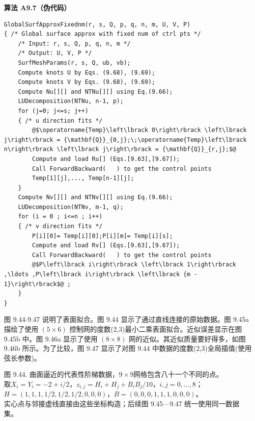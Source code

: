 \documentclass[../main.tex]{subfiles}
\begin{document}
\par\medskip\noindent\textbf{算法 A9.7（伪代码）}\par
\begin{verbatim}
GlobalSurfApproxFixednm(r, s, Q, p, q, n, m, U, V, P)
{ /* Global surface approx with fixed num of ctrl pts */
    /* Input: r, s, Q, p, q, n, m */
    /* Output: U, V, P */
    SurfMeshParams(r, s, Q, ub, vb);
    Compute knots U by Eqs. (9.68), (9.69);
    Compute knots V by Eqs. (9.68), (9.69);
    Compute Nu[][] and NTNu[][] using Eq.(9.66);
    LUDecomposition(NTNu, n-1, p);
    for (j=0; j<=s; j++)
    { /* u direction fits */
        @$\operatorname{Temp}\left\lbrack 0\right\rbrack \left\lbrack j\right\rbrack = {\mathbf{Q}}_{0,j};\;\operatorname{Temp}\left\lbrack n\right\rbrack \left\lbrack j\right\rbrack = {\mathbf{Q}}_{r,j};$@
        Compute and load Ru[] (Eqs.[9.63],[9.67]);
        Call ForwardBackward(   ) to get the control points
        Temp[1][j],..., Temp[n-1][j];
    }
    Compute Nv[][] and NTNv[][] using Eq.(9.66);
    LUDecomposition(NTNv, m-1, q);
    for (i = 0 ; i<=n ; i++)
    { /* v direction fits */
        P[i][0]= Temp[i][0];P[i][m]= Temp[i][s];
        Compute and load Rv[] (Eqs.[9.63],[9.67]);
        Call ForwardBackward(   ) to get the control points
        @$P\left\lbrack i\right\rbrack \left\lbrack 1\right\rbrack ,\ldots ,P\left\lbrack i\right\rbrack \left\lbrack {m - 1}\right\rbrack$@ ;
    }
}
\end{verbatim}

图 9.44-9.47 说明了表面拟合。图 9.44 显示了通过直线连接的原始数据。图 9.45a 描绘了使用 \(\left( {5 \times  6}\right)\) 控制网的度数(2,3)最小二乘表面拟合。近似误差显示在图 9.45b 中。图 9.46a 显示了使用 \(\left( {8 \times  8}\right)\) 网的近似。其近似质量要好得多，如图 9.46b 所示。为了比较，图 9.47 显示了对图 9.44 中数据的度数(2,3)全局插值(使用弦长参数)。

\begin{center}
\begin{minipage}{25cm}
\vspace*{.6\baselineskip}
\centering
{}
\par\smallskip
图 9.44. 曲面逼近的代表性阶梯数据，$9\times9$网格包含八十一个不同的点。\\
取$X_i=Y_i=-2+i/2$，$z_{i,j}=H_i+H_j+B_iB_j/10$，$i,j=0,\ldots,8$；\\
$H=(1,1,1,1/2,1/2,1/2,0,0,0)$，$B=(0,0,0,1,1,1,0,0,0)$。\\
实心点与邻接虚线直接由这些坐标构造；后续图 9.45—9.47 统一使用同一数据集。
\end{minipage}
\end{center}
\end{document}
